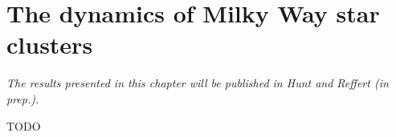 %
\chapter{The dynamics of Milky Way star clusters}
\label{sec:dynamics}


\emph{The results presented in this chapter will be published in Hunt and Reffert (\emph{in prep.}).}

TODO
